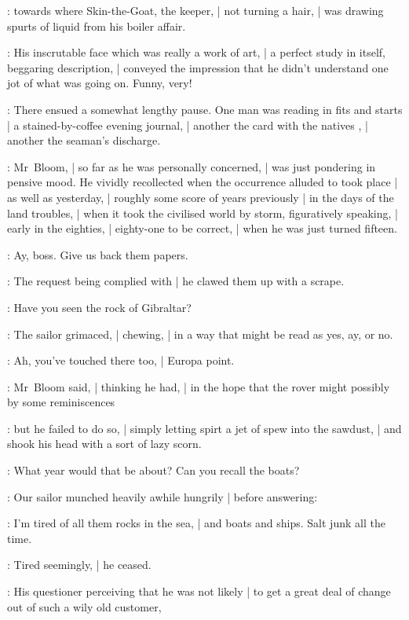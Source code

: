 :
towards where Skin-the-Goat,  the keeper, |
not turning a hair, |
was drawing spurts of liquid from his boiler affair.

:
His inscrutable face which was really a work of art, |
a perfect study in itself, beggaring description, |
conveyed the impression that he didn't understand one jot of what was going on.
Funny, very!

:
There ensued a somewhat lengthy pause.
One man was reading in fits and starts |
a stained-by-coffee evening journal, |
another the card with the natives , |
another the seaman's discharge.

:
Mr~Bloom, |
so far as he was personally concerned, |
was just pondering in pensive mood.
He vividly recollected when the occurrence alluded to took place |
as well as yesterday, |
roughly some score of years previously |
in the days of the land troubles, |
when it took the civilised world by storm, figuratively speaking, |
early in the eighties, |
eighty-one to be correct, |
when he was just turned fifteen.

\Murphy:
Ay, boss.
Give us back them papers.

:
The request being complied with |
he clawed them up with a scrape.

\Bloom:
Have you seen the rock of Gibraltar?

:
The sailor grimaced, |
chewing, |
in a way that might be read as yes, ay, or no.

\Bloom:
Ah, you've touched there too, |
Europa point.

:
Mr~Bloom said, |
thinking he had, |
in the hope that the rover might possibly by some reminiscences

:
but he failed to do so, |
simply letting spirt a jet of spew into the sawdust, |
and shook his head with a sort of lazy scorn.

\Bloom:
What year would that be about?
Can you recall the boats?

:
Our  sailor munched heavily awhile hungrily |
before answering:

\Murphy:
I'm tired of all them rocks in the sea, |
and boats and ships.
Salt junk all the time.

:
Tired seemingly, |
he ceased.

:
His questioner perceiving that he was not likely |
to get a great deal of change out of such a wily old customer,

